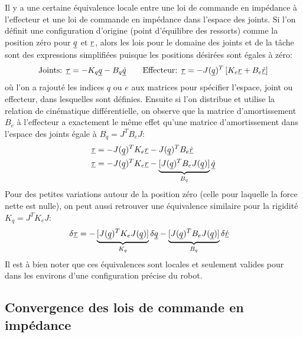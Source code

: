 Il y a une certaine équivalence locale entre une loi de commande en impédance à l'effecteur et une loi de commande en impédance dans l'espace des joints. Si l'on définit une configuration d'origine (point d'équilibre des ressorts) comme la position zéro pour $\underline{q}$ et $\underline{r}$, alors les lois pour le domaine des joints et de la tâche sont des expressions simplifiées puisque les positions désirées sont égales à zéro:
\begin{align}
	\text{Joints: }
	\underline{\tau} = - K_q \underline{q} - B_q \underline{\dot{q}}
	\quad\quad
	\text{Effecteur: }
	\underline{\tau} = - J(\underline{q})^T   \left[ K_e \underline{r} + B_e \underline{\dot{r}} \right]
\end{align}
où l'on a rajouté les indices $q$ ou $e$ aux matrices pour spécifier l'espace, joint ou effecteur, dans lesquelles
sont définies. Ensuite si l'on distribue et utilise la relation de cinématique différentielle, on observe que la matrice d'amortissement $B_e$ à l'effecteur a exactement le même effet qu'une matrice d'amortissement dans l'espace des joints égale à $B_q = J^T B_e J$:
\begin{align}
	\underline{\tau} &= - J(\underline{q})^T   K_e \underline{r} - J(\underline{q})^T B_e \underline{\dot{r}} \\
	\underline{\tau} &= - J(\underline{q})^T   K_e \underline{r} - \underbrace{ [ J(\underline{q})^T   B_e  J(\underline{q}) ] }_{ B_q } \underline{\dot{q}}
\end{align}
Pour des petites variations autour de la position zéro (celle pour laquelle la force nette est nulle), on peut aussi retrouver une équivalence similaire pour la rigidité $K_q = J^T K_e J$:
\begin{align}
	\delta \underline{\tau} &= - \underbrace{ [ J(\underline{q})^T   K_e  J(\underline{q}) ] }_{ K_q }
	\delta \underline{q} - \underbrace{ [ J(\underline{q})^T   B_e  J(\underline{q}) ] }_{ B_q }\delta \underline{\dot{r}}
\end{align}
Il est à bien noter que ces équivalences sont locales et seulement valides pour dans les environs d'une configuration précise du robot.

\subsection{Convergence des lois de commande en impédance}
\label{sec:impcontrolconvergence}

